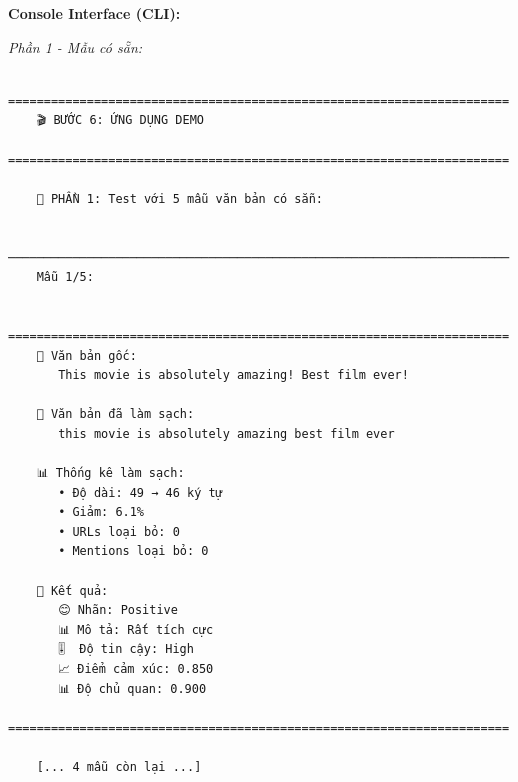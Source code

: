 \textbf{Console Interface (CLI):}

\textit{Phần 1 - Mẫu có sẵn:}
\begin{verbatim}
    ======================================================================
    🎬 BƯỚC 6: ỨNG DỤNG DEMO
    ======================================================================
    
    🧪 PHẦN 1: Test với 5 mẫu văn bản có sẵn:
    
    ──────────────────────────────────────────────────────────────────────
    Mẫu 1/5:
    
    ======================================================================
    📝 Văn bản gốc:
       This movie is absolutely amazing! Best film ever!
    
    🧹 Văn bản đã làm sạch:
       this movie is absolutely amazing best film ever
    
    📊 Thống kê làm sạch:
       • Độ dài: 49 → 46 ký tự
       • Giảm: 6.1%
       • URLs loại bỏ: 0
       • Mentions loại bỏ: 0
    
    🎯 Kết quả:
       😊 Nhãn: Positive
       📊 Mô tả: Rất tích cực
       🎚️  Độ tin cậy: High
       📈 Điểm cảm xúc: 0.850
       📊 Độ chủ quan: 0.900
    ======================================================================
    
    [... 4 mẫu còn lại ...]
\end{verbatim}

